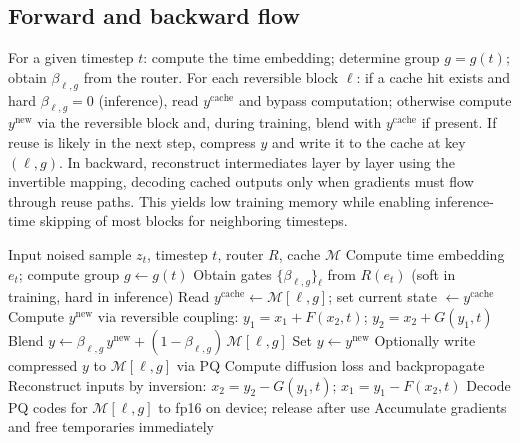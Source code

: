 \documentclass{article}
\begin{document}
\subsection{Forward and backward flow}
For a given timestep $t$: compute the time embedding; determine group $g = g(t)$; obtain $\beta_{\ell,g}$ from the router. For each reversible block $\ell$: if a cache hit exists and hard $\beta_{\ell,g} = 0$ (inference), read $y^{\text{cache}}$ and bypass computation; otherwise compute $y^{\text{new}}$ via the reversible block and, during training, blend with $y^{\text{cache}}$ if present. If reuse is likely in the next step, compress $y$ and write it to the cache at key $(\ell, g)$. In backward, reconstruct intermediates layer by layer using the invertible mapping, decoding cached outputs only when gradients must flow through reuse paths. This yields low training memory while enabling inference-time skipping of most blocks for neighboring timesteps.

\begin{algorithm}
\caption{Reversible forward and backward with scheduled layer re-use}
\begin{algorithmic}[1]
\State Input noised sample $z_t$, timestep $t$, router $R$, cache $\mathcal{M}$
\State Compute time embedding $e_t$; compute group $g \leftarrow g(t)$
\State Obtain gates $\{\beta_{\ell,g}\}_{\ell}$ from $R(e_t)$ (soft in training, hard in inference)
    \State Read $y^{\text{cache}} \leftarrow \mathcal{M}[\ell,g]$; set current state $\leftarrow y^{\text{cache}}$
  \Else
    \State Compute $y^{\text{new}}$ via reversible coupling: $y_1 = x_1 + F(x_2, t)$; $y_2 = x_2 + G(y_1, t)$
      \State Blend $y \leftarrow \beta_{\ell,g}\, y^{\text{new}} + (1-\beta_{\ell,g})\, \mathcal{M}[\ell,g]$
    \Else
      \State Set $y \leftarrow y^{\text{new}}$
    \EndIf
    \State Optionally write compressed $y$ to $\mathcal{M}[\ell,g]$ via PQ
  \EndIf
\EndFor
\State Compute diffusion loss and backpropagate
  \State Reconstruct inputs by inversion: $x_2 = y_2 - G(y_1, t)$; $x_1 = y_1 - F(x_2, t)$
    \State Decode PQ codes for $\mathcal{M}[\ell,g]$ to fp16 on device; release after use
  \EndIf
  \State Accumulate gradients and free temporaries immediately
\EndFor
\end{algorithmic}
\end{algorithm}
\end{document}
